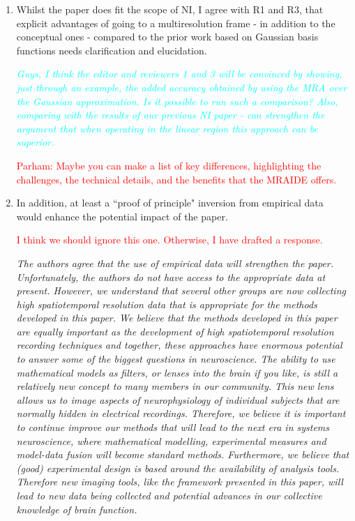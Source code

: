 \documentclass{article}
\newcommand{\dean}[1]{\textcolor{red}{#1}}
\newcommand{\ken}[1]{\textcolor{cyan}{#1}}
\begin{document}
\begin{enumerate}
\item Whilst the paper does fit the scope of NI, I agree with R1 and R3, that explicit advantages of going to a multiresolution frame - in addition to the conceptual ones - compared to the prior work based on Gaussian basis functions needs clarification and elucidation. 

\emph{\ken{Guys, I think the editor and reviewers 1 and 3 will be convinced by showing, just through an example, the added accuracy obtained by using the MRA over the Gaussian approximation. Is it possible to run such a comparison? Also, comparing with the results of our previous NI paper - can strengthen the argument that when operating in the linear region this approach can be superior.}}

\dean{Parham: Maybe you can make a list of key differences, highlighting the challenges, the technical details, and the benefits that the MRAIDE offers.}

\item  In addition, at least a ``proof of principle" inversion from empirical data would enhance the potential impact of the paper. 

\dean{I think we should ignore this one. Otherwise, I have drafted a response.}


\emph{The authors agree that the use of empirical data will strengthen the paper. Unfortunately, the authors do not have access to the appropriate data at present. However, we understand that several other groups are now collecting high spatiotemporal resolution data that is appropriate for the methods developed in this paper. We believe that the methods developed in this paper are equally important as the development of high spatiotemporal resolution recording techniques and together, these approaches have enormous potential to answer some of the biggest questions in neuroscience. The ability to use mathematical models as filters, or lenses into the brain if you like, is still a relatively new concept to many members in our community. This new lens allows us to image aspects of neurophysiology of individual subjects that are normally hidden in electrical recordings. Therefore, we believe it is important to continue improve our methods that will lead to the next era in systems neuroscience, where mathematical modelling, experimental measures and model-data fusion will become standard methods. Furthermore, we believe that (good) experimental design is based around the availability of analysis tools. Therefore new imaging tools, like the framework presented in this paper, will lead to new data being collected and potential advances in our collective knowledge of brain function. } 
	
\end{enumerate}
\end{document}
